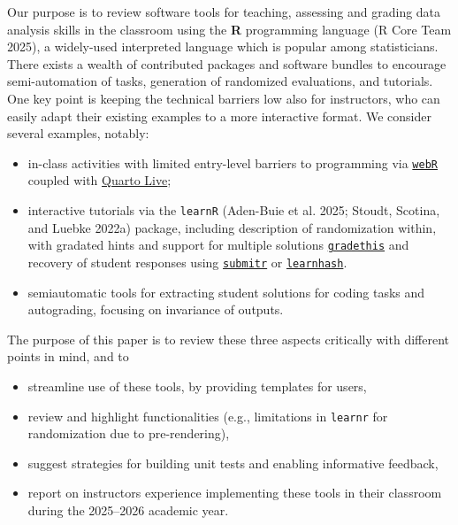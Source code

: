 \documentclass[
  letterpaper,
  DIV=11,
  numbers=noendperiod]{scrartcl}
\providecommand{\tightlist}{%
  \setlength{\itemsep}{0pt}\setlength{\parskip}{0pt}}
\begin{document}
Our purpose is to review software tools for teaching, assessing and
grading data analysis skills in the classroom using the \textbf{R}
programming language (R Core Team 2025), a widely-used interpreted
language which is popular among statisticians. There exists a wealth of
contributed packages and software bundles to encourage semi-automation
of tasks, generation of randomized evaluations, and tutorials. One key
point is keeping the technical barriers low also for instructors, who
can easily adapt their existing examples to a more interactive format.
We consider several examples, notably:

\begin{itemize}
\tightlist
\item
  in-class activities with limited entry-level barriers to programming
  via \href{https://docs.r-wasm.org/webr/latest/}{\texttt{webR}} coupled
  with \href{https://r-wasm.github.io/quarto-live/}{Quarto Live};
\item
  interactive tutorials via the \texttt{learnR} (Aden-Buie et al. 2025;
  Stoudt, Scotina, and Luebke 2022a) package, including description of
  randomization within, with gradated hints and support for multiple
  solutions
  \href{https://pkgs.rstudio.com/gradethis/}{\texttt{gradethis}} and
  recovery of student responses using
  \href{https://dtkaplan.github.io/submitr/articles/using.html}{\texttt{submitr}}
  or \href{https://github.com/rundel/learnrhash}{\texttt{learnhash}}.
\item
  semiautomatic tools for extracting student solutions for coding tasks
  and autograding, focusing on invariance of outputs.
\end{itemize}

The purpose of this paper is to review these three aspects critically
with different points in mind, and to

\begin{itemize}
\tightlist
\item
  streamline use of these tools, by providing templates for users,
\item
  review and highlight functionalities (e.g., limitations in
  \texttt{learnr} for randomization due to pre-rendering),
\item
  suggest strategies for building unit tests and enabling informative
  feedback,
\item
  report on instructors experience implementing these tools in their
  classroom during the 2025--2026 academic year.
\end{itemize}
\end{document}
